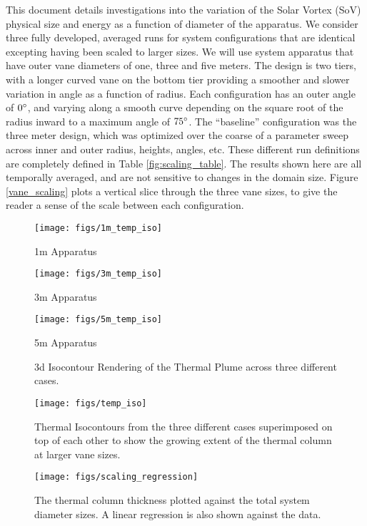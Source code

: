 \documentclass[english]{article}
\begin{document}
This document details investigations into the variation of the Solar Vortex (SoV) physical size and energy as a function of diameter of the apparatus. We consider 
three fully developed, averaged runs for system configurations that are identical excepting having been scaled to larger sizes. We will use 
system apparatus that have outer vane diameters of one, three and five meters. The design is two tiers, with a longer curved vane on the bottom tier providing a 
smoother and slower variation in angle as a function of radius. Each configuration has an outer angle of $0\degree$, and varying along a smooth curve 
depending on the square root of the radius inward to a maximum angle of $75\degree$. The ``baseline'' configuration was the three meter design, 
which was optimized over the coarse of a parameter sweep across inner and outer radius, heights, angles, etc. These different run 
definitions are completely defined in Table \ref{fig:scaling_table}. The results shown here are all temporally averaged, and are not sensitive to changes in the domain size.
%
%
Figure \ref{vane_scaling} plots a vertical slice through the three vane sizes, to give the reader a sense of the 
scale between each configuration.

\begin{figure}[!htb]
  \texttt{[image: figs/1m\_temp\_iso]}
  \caption*{1m Apparatus}\label{fig:1m_scaling}
\endminipage\hfill
{}
  \texttt{[image: figs/3m\_temp\_iso]}
  \caption*{3m Apparatus}\label{fig:3m_scaling}
\endminipage\hfill
{}%
  \texttt{[image: figs/5m\_temp\_iso]}
  \caption*{5m Apparatus}\label{fig:5m_scaling}
\endminipage
\caption{3d Isocontour Rendering of the Thermal Plume across three different cases.}
\label{fig:iso}
\end{figure}


\begin{figure}[!htb]
  \begin{center}
    \texttt{[image: figs/temp\_iso]}
    \caption{Thermal Isocontours from the three different cases superimposed 
      on top of each other to show the growing extent of the thermal column at larger vane sizes. }
    \label{fig:scaling_slice}
  \end{center}
\end{figure}

\begin{figure}[!htb]
  \begin{center}
    \texttt{[image: figs/scaling\_regression]}
    \caption{The thermal column thickness plotted against the total system diameter sizes. A linear regression is also shown against the data.}
    \label{fig:scaling_reg}
  \end{center}
\end{figure}
\end{document}
